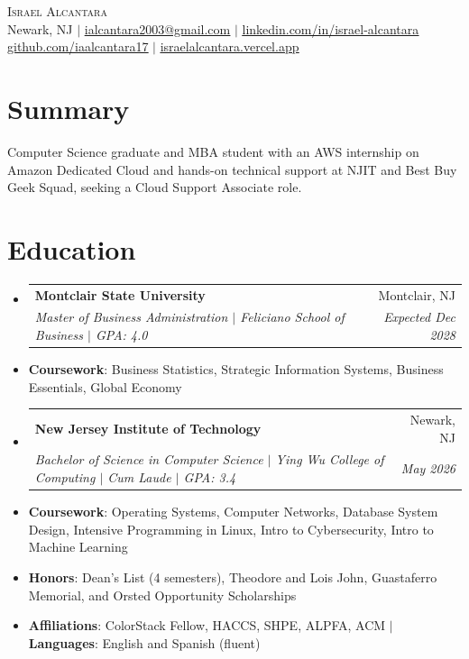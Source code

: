 \documentclass[letterpaper,11pt]{article}
\makeatletter
\newcommand{\resumeFirstLine}[1]{\vspace{3pt}\item[]\small{#1}}
\newcommand{\resumeLine}[1]{\vspace{-1pt}\item[]\small{#1}}
\newcommand{\resumeSchoolGap}{\vspace{3pt}}
\newcommand{\resumeSubheading}[4]{
  \vspace{-2pt}\item
    \begin{tabular*}{0.97\textwidth}[t]{l@{\extracolsep{\fill}}r}
      \textbf{#1} & #2 \\
      \textit{\small#3} & \textit{\small #4} \\
    \end{tabular*}\vspace{-7pt}
}
\newcommand{\resumeSubHeadingListStart}{\begin{itemize}[leftmargin=0.15in, label={}, itemsep=1pt, parsep=0pt, topsep=2pt]}
\newcommand{\resumeSubHeadingListEnd}{\end{itemize}}
\makeatother
\begin{document}
\begin{center}
    {\Huge \scshape Israel Alcantara} \\ \vspace{1pt}
    \small Newark, NJ $|$ \href{mailto:ialcantara2003@gmail.com}{\underline{ialcantara2003@gmail.com}} $|$
    \href{https://www.linkedin.com/in/israel-alcantara}{\underline{linkedin.com/in/israel-alcantara}} \\
    \href{https://github.com/iaalcantara17}{\underline{github.com/iaalcantara17}} $|$
    \href{https://israelalcantara.vercel.app}{\underline{israelalcantara.vercel.app}}
\end{center}
\vspace{-8pt}
\section{Summary}
\begin{itemize}[leftmargin=0.15in, label={}]
    \small{\item{Computer Science graduate and MBA student with an AWS internship on Amazon Dedicated Cloud and hands-on technical support at NJIT and Best Buy Geek Squad, seeking a Cloud Support Associate role.}}
\end{itemize}

\section{Education}
  \resumeSubHeadingListStart
    \resumeSubheading
      {Montclair State University}{Montclair, NJ}
      {Master of Business Administration $|$ Feliciano School of Business $|$ GPA: 4.0}{Expected Dec 2028}
      \resumeFirstLine{\textbf{Coursework}: Business Statistics, Strategic Information Systems, Business Essentials, Global Economy}
    \resumeSchoolGap
    \resumeSubheading
      {New Jersey Institute of Technology}{Newark, NJ}
      {Bachelor of Science in Computer Science $|$ Ying Wu College of Computing $|$ Cum Laude $|$ GPA: 3.4}{May 2026}
      \resumeFirstLine{\textbf{Coursework}: Operating Systems, Computer Networks, Database System Design, Intensive Programming in Linux, Intro to Cybersecurity, Intro to Machine Learning}
      \resumeLine{\textbf{Honors}: Dean's List (4 semesters), Theodore and Lois John, Guastaferro Memorial, and Orsted Opportunity Scholarships}
      \resumeLine{\textbf{Affiliations}: ColorStack Fellow, HACCS, SHPE, ALPFA, ACM $|$ \textbf{Languages}: English and Spanish (fluent)}
  \resumeSubHeadingListEnd
\end{document}
